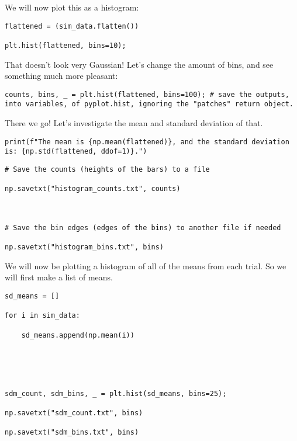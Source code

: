 \documentclass[12pt]{article}
\begin{document}
We will now plot this as a histogram:


\begin{lstlisting}[frame=shadowbox]
flattened = (sim_data.flatten())

plt.hist(flattened, bins=10);
\end{lstlisting}


That doesn't look very Gaussian! Let's change the amount of bins, and see something much more pleasant:


\begin{lstlisting}[frame=shadowbox]
counts, bins, _ = plt.hist(flattened, bins=100); # save the outputs, into variables, of pyplot.hist, ignoring the "patches" return object.
\end{lstlisting}


There we go! Let's investigate the mean and standard deviation of that.


\begin{lstlisting}[frame=shadowbox]
print(f"The mean is {np.mean(flattened)}, and the standard deviation is: {np.std(flattened, ddof=1)}.")
\end{lstlisting}
	


\begin{lstlisting}[frame=shadowbox]
# Save the counts (heights of the bars) to a file

np.savetxt("histogram_counts.txt", counts)



# Save the bin edges (edges of the bins) to another file if needed

np.savetxt("histogram_bins.txt", bins)
\end{lstlisting}


We will now be plotting a histogram of all of the means from each trial. So we will first make a list of means.


\begin{lstlisting}[frame=shadowbox]
sd_means = []

for i in sim_data:

    sd_means.append(np.mean(i))





sdm_count, sdm_bins, _ = plt.hist(sd_means, bins=25);

np.savetxt("sdm_count.txt", bins)

np.savetxt("sdm_bins.txt", bins)
\end{lstlisting}
\end{document}

